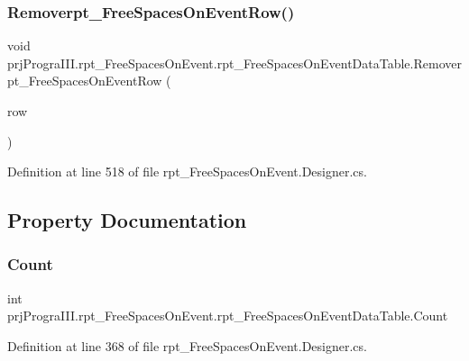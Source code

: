 \subsubsection{\texorpdfstring{Removerpt\+\_\+\+Free\+Spaces\+On\+Event\+Row()}{Removerpt\_FreeSpacesOnEventRow()}}
{\footnotesize\ttfamily void prj\+Progra\+I\+I\+I.\+rpt\+\_\+\+Free\+Spaces\+On\+Event.\+rpt\+\_\+\+Free\+Spaces\+On\+Event\+Data\+Table.\+Removerpt\+\_\+\+Free\+Spaces\+On\+Event\+Row (\begin{DoxyParamCaption}\item[{\hyperlink{classprj_progra_i_i_i_1_1rpt___free_spaces_on_event_1_1rpt___free_spaces_on_event_row}{rpt\+\_\+\+Free\+Spaces\+On\+Event\+Row}}]{row }\end{DoxyParamCaption})}



Definition at line 518 of file rpt\+\_\+\+Free\+Spaces\+On\+Event.\+Designer.\+cs.



\subsection{Property Documentation}
\hypertarget{classprj_progra_i_i_i_1_1rpt___free_spaces_on_event_1_1rpt___free_spaces_on_event_data_table_aae1ea79c3c276771f38878642b2f8a16}{}\label{classprj_progra_i_i_i_1_1rpt___free_spaces_on_event_1_1rpt___free_spaces_on_event_data_table_aae1ea79c3c276771f38878642b2f8a16} 
\subsubsection{\texorpdfstring{Count}{Count}}
{\footnotesize\ttfamily int prj\+Progra\+I\+I\+I.\+rpt\+\_\+\+Free\+Spaces\+On\+Event.\+rpt\+\_\+\+Free\+Spaces\+On\+Event\+Data\+Table.\+Count\hspace{0.3cm}{\ttfamily [get]}}



Definition at line 368 of file rpt\+\_\+\+Free\+Spaces\+On\+Event.\+Designer.\+cs.

